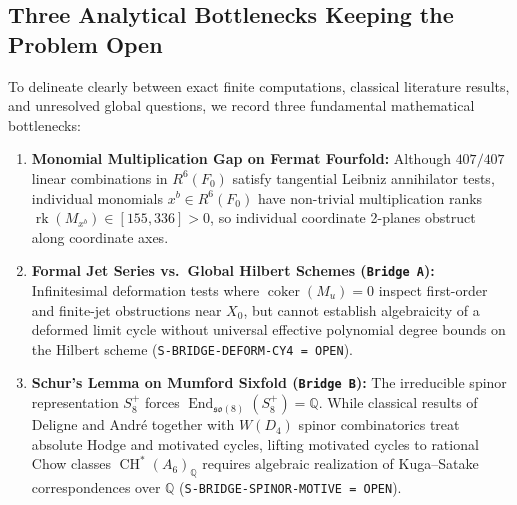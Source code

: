 \documentclass[11pt,a4paper]{article}
\theoremstyle{definition}
\theoremstyle{remark}
\DeclareMathOperator{\rk}{rk}
\DeclareMathOperator{\coker}{coker}
\DeclareMathOperator{\End}{End}
\DeclareMathOperator{\CH}{CH}
\begin{document}
\subsection{Three Analytical Bottlenecks Keeping the Problem Open}
To delineate clearly between exact finite computations, classical literature results, and unresolved global questions, we record three fundamental mathematical bottlenecks:
\begin{enumerate}[leftmargin=1.8em]
\item \textbf{Monomial Multiplication Gap on Fermat Fourfold:} Although $407/407$ linear combinations in $R^6(F_0)$ satisfy tangential Leibniz annihilator tests, individual monomials $x^b \in R^6(F_0)$ have non-trivial multiplication ranks $\rk(M_{x^b}) \in [155, 336] > 0$, so individual coordinate 2-planes obstruct along coordinate axes.
\item \textbf{Formal Jet Series vs.\ Global Hilbert Schemes (\texttt{Bridge~A}):} Infinitesimal deformation tests where $\coker(M_u) = 0$ inspect first-order and finite-jet obstructions near $X_0$, but cannot establish algebraicity of a deformed limit cycle without universal effective polynomial degree bounds on the Hilbert scheme (\texttt{S-BRIDGE-DEFORM-CY4 = OPEN}).
\item \textbf{Schur's Lemma on Mumford Sixfold (\texttt{Bridge~B}):} The irreducible spinor representation $S^+_8$ forces $\End_{\mathfrak{so}(8)}(S^+_8) = \mathbb{Q}$. While classical results of Deligne \cite{Deligne1982} and Andr\'e \cite{Andre1996} together with $W(D_4)$ spinor combinatorics treat absolute Hodge and motivated cycles, lifting motivated cycles to rational Chow classes $\CH^*(A_6)_{\mathbb{Q}}$ requires algebraic realization of Kuga--Satake correspondences over $\mathbb{Q}$ (\texttt{S-BRIDGE-SPINOR-MOTIVE = OPEN}).
\end{enumerate}
\end{document}
